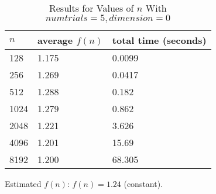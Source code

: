 \documentclass[11pt]{article}
\begin{document}
	\begin{table}[h]
		\centering
		\caption{Results for Values of $n$ With $numtrials = 5, dimension = 0$}
		\begin{tabular}{lll}
			$n$                         & average $f(n)$                        & total time (seconds)                        \\ \hline
			\multicolumn{1}{|l|}{128} & \multicolumn{1}{l|}{1.175} & \multicolumn{1}{l|}{0.0099} \\ \hline
			\multicolumn{1}{|l|}{256}    & \multicolumn{1}{l|}{1.269}       & \multicolumn{1}{l|}{0.0417}       \\ \hline
			\multicolumn{1}{|l|}{512}    & \multicolumn{1}{l|}{1.288}       & \multicolumn{1}{l|}{0.182}       \\ \hline
			\multicolumn{1}{|l|}{1024}    & \multicolumn{1}{l|}{1.279}       & \multicolumn{1}{l|}{0.862}       \\ \hline
			\multicolumn{1}{|l|}{2048}    & \multicolumn{1}{l|}{1.221}       & \multicolumn{1}{l|}{3.626}       \\ \hline
			\multicolumn{1}{|l|}{4096}    & \multicolumn{1}{l|}{1.201}       & \multicolumn{1}{l|}{15.69}       \\ \hline
			\multicolumn{1}{|l|}{8192}    & \multicolumn{1}{l|}{1.200}       & \multicolumn{1}{l|}{68.305}       \\ \hline
		\end{tabular}
	\end{table}
	Estimated $f(n)$: $f(n) = 1.24$ (constant).\\
	
\end{document}
